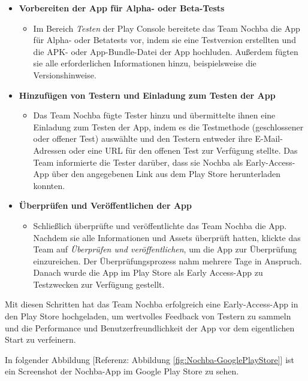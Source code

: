 \begin{itemize}
    \item \textbf{Vorbereiten der App für Alpha- oder Beta-Tests}
          \begin{itemize}
              \item {Im Bereich \textit{Testen} der Play Console bereitete das Team Nochba die App für Alpha- oder Betatests vor, indem sie eine Testversion erstellten und die APK- oder App-Bundle-Datei der App hochluden. Außerdem fügten sie alle erforderlichen Informationen hinzu, beispielsweise die Versionshinweise.}
          \end{itemize}
    \item \textbf{Hinzufügen von Testern und Einladung zum Testen der App}
          \begin{itemize}
              \item {Das Team Nochba fügte Tester hinzu und übermittelte ihnen eine Einladung zum Testen der App, indem es die Testmethode (geschlossener oder offener Test) auswählte und den Testern entweder ihre E-Mail-Adressen oder eine URL für den offenen Test zur Verfügung stellte. Das Team informierte die Tester darüber, dass sie Nochba als Early-Access-App über den angegebenen Link aus dem Play Store herunterladen konnten.}
          \end{itemize}
    \item \textbf{Überprüfen und Veröffentlichen der App}
          \begin{itemize}
              \item {Schließlich überprüfte und veröffentlichte das Team Nochba die App. Nachdem sie alle Informationen und Assets überprüft hatten, klickte das Team auf \textit{Überprüfen und veröffentlichen}, um die App zur Überprüfung einzureichen. Der Überprüfungsprozess nahm mehrere Tage in Anspruch. Danach wurde die App im Play Store als Early Access-App zu Testzwecken zur Verfügung gestellt.}
          \end{itemize}
\end{itemize}

Mit diesen Schritten hat das Team Nochba erfolgreich eine Early-Access-App in den Play Store hochgeladen, um wertvolles Feedback von Testern zu sammeln und die Performance und Benutzerfreundlichkeit der App vor dem eigentlichen Start zu verfeinern. 

In folgender Abbildung [Referenz: Abbildung \ref{fig:Nochba-GooglePlayStore}] ist ein Screenshot der Nochba-App im Google Play Store zu sehen.

